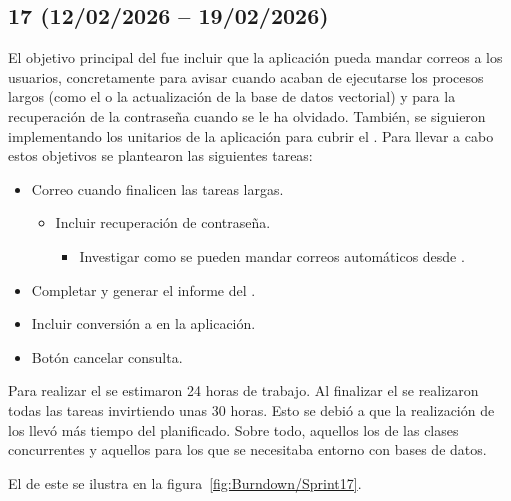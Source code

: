 \subsection{ 17 (12/02/2026 -- 19/02/2026)}
El objetivo principal del  fue incluir que la aplicación pueda mandar correos a los usuarios, concretamente para avisar cuando acaban de ejecutarse los procesos largos (como el  o la actualización de la base de datos vectorial) y para la recuperación de la contraseña cuando se le ha olvidado. También, se siguieron implementando los  unitarios de la aplicación para cubrir el . Para llevar a cabo estos objetivos se plantearon las siguientes tareas:
\begin{itemize}
\tightlist
	\item Correo cuando finalicen las tareas largas.
	\begin{itemize}
	\tightlist
		\item Incluir recuperación de contraseña.
		\begin{itemize}
		\tightlist
			\item Investigar como se pueden mandar correos automáticos desde .
		\end{itemize}
	\end{itemize}
	\item Completar  y generar el informe del .
	\item Incluir conversión a  en la aplicación.
	\item Botón cancelar consulta.
\end{itemize}

Para realizar el  se estimaron 24 horas de trabajo. Al finalizar el  se realizaron todas las tareas invirtiendo unas 30 horas. Esto se debió a que la realización de los  llevó más tiempo del planificado. Sobre todo, aquellos los de las clases concurrentes y aquellos para los que se necesitaba entorno con bases de datos.

El  de este  se ilustra en la figura~\ref{fig:Burndown/Sprint17}.

